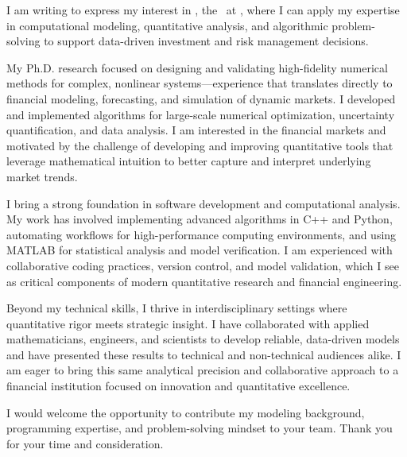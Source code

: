 I am writing to express my interest in 
\ifdefempty{\jobtitle}
  {\company,} %
  {the \jobtitle\ at \company,} %
where I can apply my expertise in computational modeling, quantitative analysis, and algorithmic problem-solving to support data-driven investment and risk management decisions.

My Ph.D. research focused on designing and validating high-fidelity numerical methods for complex, nonlinear systems—experience that translates directly to financial modeling, forecasting, and simulation of dynamic markets. I developed and implemented algorithms for large-scale numerical optimization, uncertainty quantification, and data analysis.  I am interested in the financial markets and motivated by the challenge of developing and improving quantitative tools that leverage mathematical intuition to better capture and interpret underlying market trends.

I bring a strong foundation in software development and computational analysis. My work has involved implementing advanced algorithms in C++ and Python, automating workflows for high-performance computing environments, and using MATLAB for statistical analysis and model verification. I am experienced with collaborative coding practices, version control, and model validation, which I see as critical components of modern quantitative research and financial engineering.

Beyond my technical skills, I thrive in interdisciplinary settings where quantitative rigor meets strategic insight. I have collaborated with applied mathematicians, engineers, and scientists to develop reliable, data-driven models and have presented these results to technical and non-technical audiences alike. I am eager to bring this same analytical precision and collaborative approach to a financial institution focused on innovation and quantitative excellence.

I would welcome the opportunity to contribute my modeling background, programming expertise, and problem-solving mindset to your team. Thank you for your time and consideration.